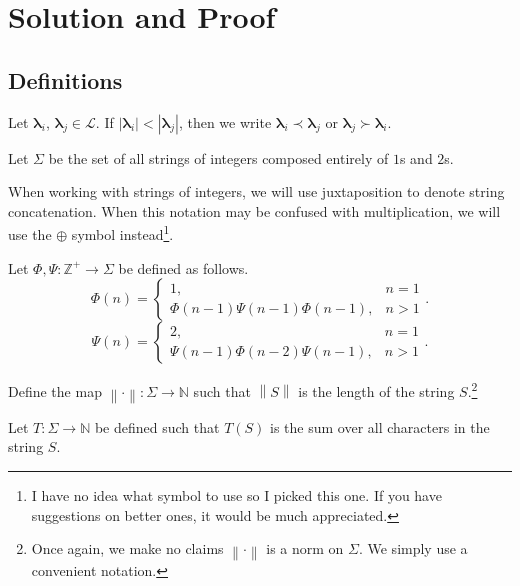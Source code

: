 \documentclass[11pt, letterpaper]{article}
\begin{document}
\section{Solution and Proof}
\subsection{Definitions}
\begin{notation}
	Let $\boldsymbol{\lambda}_i$, $\boldsymbol{\lambda}_j\in \mathcal{L} $. If $\left| \boldsymbol{\lambda}_i \right| < \left| \boldsymbol{\lambda}_j \right| $, then we write $\boldsymbol{\lambda}_i \prec \boldsymbol{\lambda}_j$ or $\boldsymbol{\lambda}_j \succ \boldsymbol{\lambda}_i$.
\end{notation}
\begin{definition}[Strings]\label{dfn:5}
	Let $\Sigma  $ be the set of all strings of integers composed entirely of $ 1$s and $2$s.
\end{definition}
\begin{notation}
	When working with strings of integers, we will use juxtaposition to denote string concatenation. When this notation may be confused with multiplication, we will use the $\oplus $ symbol instead\footnote{I have no idea what symbol to use so I picked this one. If you have suggestions on better ones, it would be much appreciated.}.
\end{notation}
\begin{definition}\label{dfn:6}
	Let $\Phi ,\Psi : \mathbb{Z}^+ \to \Sigma $ be defined as follows.
	\[
		\Phi (n)=\begin{cases}
			1,&n=1\\
			\Phi (n-1)\Psi (n-1)\Phi (n-1),&n>1
		\end{cases}
	.\]
	\[
		\Psi (n)=
		\begin{cases}
			2,&n=1\\
			\Psi (n-1)\Phi (n-2)\Psi (n-1),&n>1
		\end{cases}
	.\]
\end{definition}
\begin{definition}\label{dfn:8}
	Define the map $\left\lVert \cdot  \right\rVert : \Sigma  \to \mathbb{N}$ such that $\left\lVert S \right\rVert $ is the length of the string $S$.\footnote{Once again, we make no claims $\left\lVert \cdot  \right\rVert $ is a norm on $\Sigma $. We simply use a convenient notation.}
\end{definition}
\begin{definition}\label{dfn:9}
	Let $T : \Sigma  \to \mathbb{N}$ be defined such that $T(S)$ is the sum over all characters in the string $S$.
\end{definition}
\end{document}
